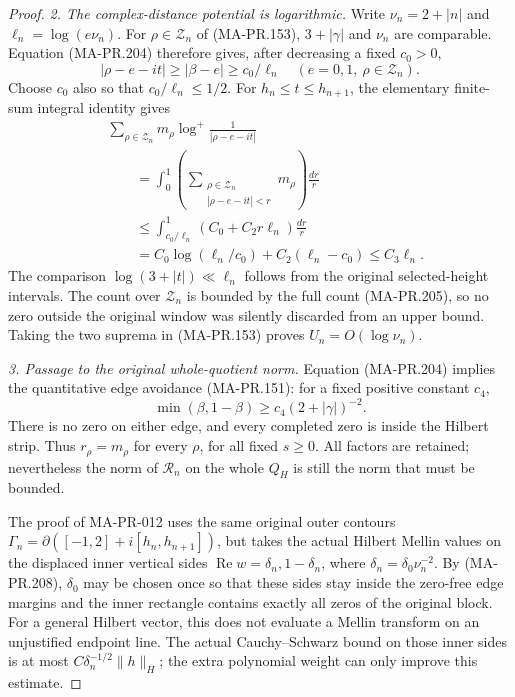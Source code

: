 \begin{proof}
\emph{2. The complex-distance potential is logarithmic.}
Write \(\nu_n=2+|n|\) and
\(\ell_n=\log(e\nu_n)\).
For \(\rho\in\mathcal Z_n\) of (MA-PR.153),
\(3+|\gamma|\) and \(\nu_n\) are comparable.
Equation (MA-PR.204) therefore gives, after
decreasing a fixed \(c_0>0\),
\[
   |\rho-e-it|\ge|\beta-e|
                  \ge c_0/\ell_n
       \quad(e=0,1,\ \rho\in\mathcal Z_n).
 \tag{MA-PR.206}
\]
Choose \(c_0\) also so that \(c_0/\ell_n\le1/2\).
For \(h_n\le t\le h_{n+1}\), the elementary
finite-sum integral identity gives
\[
 \begin{split}
 &\sum_{\rho\in\mathcal Z_n}m_\rho
                  \log^+\frac1{|\rho-e-it|}\\
 &\qquad
 =\int_0^1
       \left(\sum_{\substack{\rho\in\mathcal Z_n\\
                               |\rho-e-it|<r}}m_\rho\right)
                                                      \frac{dr}{r}\\
 &\qquad
 \le \int_{c_0/\ell_n}^{1}
                         (C_0+C_2r\ell_n)\frac{dr}{r}\\
 &\qquad
 =C_0\log(\ell_n/c_0)+C_2(\ell_n-c_0)
                                      \le C_3\ell_n .
 \end{split}
 \tag{MA-PR.207}
\]
The comparison \(\log(3+|t|)\ll\ell_n\) follows
from the original selected-height intervals.
The count over \(\mathcal Z_n\) is bounded by
the full count (MA-PR.205), so no zero outside
the original window was silently discarded
from an upper bound.  Taking the two suprema
in (MA-PR.153) proves \(U_n=O(\log\nu_n)\).

\emph{3. Passage to the original whole-quotient norm.}
Equation (MA-PR.204) implies the quantitative
edge avoidance (MA-PR.151): for a fixed positive
constant \(c_4\),
\[
       \min(\beta,1-\beta)
                          \ge c_4(2+|\gamma|)^{-2}.
 \tag{MA-PR.208}
\]
There is no zero on either edge, and every
completed zero is inside the Hilbert strip.
Thus \(r_\rho=m_\rho\) for every \(\rho\),
for all fixed \(s\ge0\).
All factors are retained; nevertheless the
norm of \(\mathscr R_n\) on the whole \(Q_H\)
is still the norm that must be bounded.

The proof of MA-PR-012 uses the same original
outer contours
\(\Gamma_n=\partial([-1,2]+i[h_n,h_{n+1}])\),
but takes the actual Hilbert Mellin values
on the displaced inner vertical sides
\(\operatorname{Re}w=\delta_n,1-\delta_n\),
where \(\delta_n=\delta_0\nu_n^{-2}\).
By (MA-PR.208), \(\delta_0\) may be chosen
once so that these sides stay inside the
zero-free edge margins and the inner rectangle
contains exactly all zeros of the original
block.  For a general Hilbert vector, this
does not evaluate a Mellin transform on an
unjustified endpoint line.  The actual
Cauchy--Schwarz bound on those inner sides
is at most \(C\delta_n^{-1/2}\|h\|_H\);
the extra polynomial weight can only improve
this estimate.


\end{proof}
